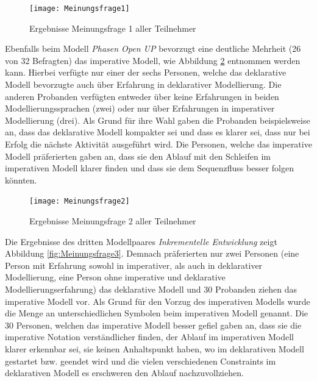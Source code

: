 \begin{figure}[htp]
\begin{center}
  \texttt{[image: Meinungsfrage1]} %
  \caption{Ergebnisse Meinungsfrage 1 aller Teilnehmer}
  \label{fig:Meinungsfrage1}
\end{center}
\end{figure}

Ebenfalls beim Modell \textit{Phasen Open UP} bevorzugt eine deutliche Mehrheit (26 von 32 Befragten) das imperative Modell, wie Abbildung \ref{fig:Meinungsfrage2} entnommen werden kann. \newline
Hierbei verfügte nur einer der sechs Personen, welche das deklarative Modell bevorzugte auch über Erfahrung in deklarativer Modellierung. Die anderen Probanden verfügten entweder über keine Erfahrungen in beiden Modellierungssprachen (zwei) oder nur über Erfahrungen in imperativer Modellierung (drei). Als Grund für ihre Wahl gaben die Probanden beispielsweise an, dass das deklarative Modell kompakter sei und dass es klarer sei, dass nur bei Erfolg die nächste Aktivität ausgeführt wird.\newline
Die Personen, welche das imperative Modell präferierten gaben an, dass sie den Ablauf mit den Schleifen im imperativen Modell klarer finden und dass sie dem Sequenzfluss besser folgen könnten.\newline


\begin{figure}[htp]
\begin{center}
  \texttt{[image: Meinungsfrage2]} %
  \caption{Ergebnisse Meinungsfrage 2 aller Teilnehmer}
  \label{fig:Meinungsfrage2}
\end{center}
\end{figure}

Die Ergebnisse des dritten Modellpaares \textit{Inkrementelle Entwicklung} zeigt Abbildung \ref{fig:Meinungsfrage3}. Demnach präferierten nur zwei Personen (eine Person mit Erfahrung sowohl in imperativer, als auch in deklarativer Modellierung, eine Person ohne imperative und deklarative Modellierungserfahrung) das deklarative Modell und 30 Probanden ziehen das imperative Modell vor.\newline
Als Grund für den Vorzug des imperativen Modells wurde die Menge an unterschiedlichen Symbolen beim imperativen Modell genannt. \newline
Die 30 Personen, welchen das imperative Modell besser gefiel gaben an, dass sie die imperative Notation verständlicher finden, der Ablauf im imperativen Modell klarer erkennbar sei, sie keinen Anhaltspunkt haben, wo im deklarativen Modell gestartet bzw. geendet wird und die vielen verschiedenen Constraints im deklarativen Modell es erschweren den Ablauf nachzuvollziehen.\newline

